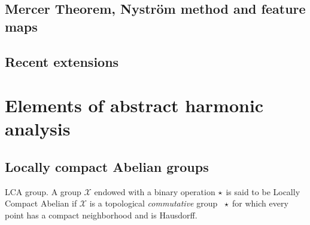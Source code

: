 \subsection{Mercer Theorem, Nystr\"om method and feature maps}

\subsection{Recent extensions}

\section{Elements of abstract harmonic analysis}
\label{sec:abstract_harmonic}

\subsection{Locally compact Abelian groups}
\begin{definition}{\acl{LCA} group.}
A group $\mathcal{X}$ endowed with a binary operation $\star$ is said to be Locally Compact Abelian if $\mathcal{X}$ is a topological \emph{commutative} group \wrt~$\star$ for which every point has a compact neighborhood and is Hausdorff.
\end{definition}

